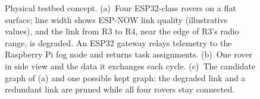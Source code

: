 \begin{figure}[p]
\caption[Physical testbed concept.]{Physical testbed concept. (a)~Four ESP32-class rovers
on a flat surface; line width shows ESP-NOW link quality (illustrative values),
and the link from R3 to R4, near the edge of R3's radio range, is degraded. An
ESP32 gateway relays telemetry to the Raspberry Pi fog node and returns task
assignments. (b)~One rover in side view and the data it exchanges each cycle.
(c)~The candidate graph of (a) and one possible kept graph: the degraded link
and a redundant link are pruned while all four rovers stay connected.}
\label{fig:arch:testbed}
\end{figure}
